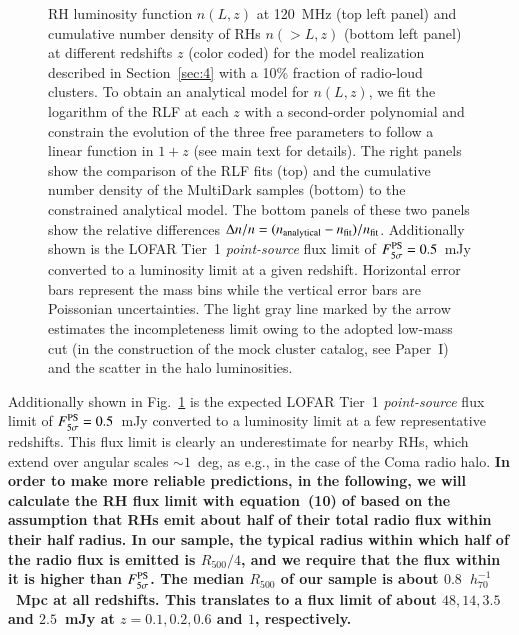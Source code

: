 \documentclass[useAMS,usenatbib]{mn2e}
\begin{document}
\begin{figure}
\caption{RH luminosity function $n(L,z)$ at 120~MHz (top left panel) and cumulative
  number density of RHs  $n(>L,z)$ (bottom left panel) at different redshifts $z$ (color
  coded) for the model realization described in Section~\ref{sec:4} with a 10\%
  fraction of radio-loud clusters. To obtain an analytical model for $n(L,z)$,
  we fit the logarithm of the RLF at each $z$ with a second-order polynomial and
  constrain the evolution of the three free parameters to follow a linear
  function in $1+z$ (see main text for details). The right panels show the
  comparison of the RLF fits (top) and the cumulative number density of the
  MultiDark samples (bottom) to the constrained analytical model. The bottom panels of these
  two panels show the relative differences $\Delta n / n =
  (n_{{\mathrm{analytical}}} - n_{{\mathrm{fit}}})/n_{{\mathrm{fit}}}$. Additionally shown is
  the LOFAR Tier~1 \emph{point-source} flux limit of
  $F_{5\sigma}^{{\mathrm{PS}}}=0.5$~mJy \citep{2012JApA..tmp...34R} converted to a
  luminosity limit at a given redshift. Horizontal error bars represent the mass
  bins while the vertical error bars are Poissonian uncertainties.  The light
  gray line marked by the arrow estimates the incompleteness limit owing to the
  adopted low-mass cut (in the construction of the mock cluster catalog, see Paper~I)
  and the scatter in the halo luminosities.}
\label{fig:RLF_120}
\end{figure} 

Additionally shown in Fig.~\ref{fig:RLF_120} is the expected LOFAR Tier~1
\emph{point-source} flux limit of $F_{5\sigma}^{{\mathrm{PS}}}=0.5$~mJy
\citep{2012JApA..tmp...34R} converted to a luminosity limit at a few representative
redshifts. This flux limit is clearly an underestimate for nearby RHs, which
extend over angular scales $\sim1$~deg, as e.g., in the case of the Coma radio
halo. {\bf In order to make more reliable predictions, in the following, we will
calculate the RH flux limit with equation~(10) of \cite{2010A&A...509A..68C}
based on the assumption that RHs emit about half of their total radio flux within 
their half radius. In our sample, the typical radius within which half of the
radio flux is emitted is $R_{500}/4$, and we require that the flux within it is
higher than $F_{5\sigma}^{{\mathrm{PS}}}$. The median $R_{500}$ of our sample 
is about $0.8$~$h_{70}^{-1}$~Mpc at all redshifts. This translates to a flux limit 
of about $48, 14, 3.5$ and $2.5$~mJy at $z = 0.1, 0.2, 0.6$ and $1$, respectively.}
\end{document}
